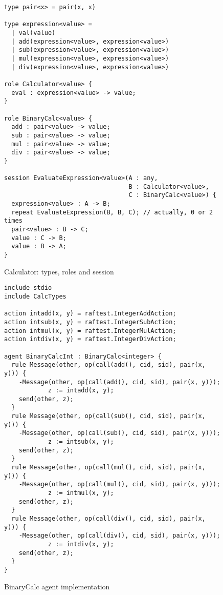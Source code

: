 \documentclass[a4paper,12pt,oneside,fleqn]{book} %
\begin{document}
\begin{figure}\footnotesize %
\begin{verbatim}
type pair<x> = pair(x, x)

type expression<value> =
  | val(value)
  | add(expression<value>, expression<value>)
  | sub(expression<value>, expression<value>)
  | mul(expression<value>, expression<value>)
  | div(expression<value>, expression<value>)

role Calculator<value> {
  eval : expression<value> -> value;
}

role BinaryCalc<value> {
  add : pair<value> -> value;
  sub : pair<value> -> value;
  mul : pair<value> -> value;
  div : pair<value> -> value;
}

session EvaluateExpression<value>(A : any,
                                  B : Calculator<value>,
                                  C : BinaryCalc<value>) {
  expression<value> : A -> B;
  repeat EvaluateExpression(B, B, C); // actually, 0 or 2 times
  pair<value> : B -> C;
  value : C -> B;
  value : B -> A;
}
\end{verbatim}
\caption{Calculator: types, roles and session}
\label{fig:calc-roles}
\end{figure} %

\begin{figure}\footnotesize %
\begin{verbatim}
include stdio
include CalcTypes

action intadd(x, y) = raftest.IntegerAddAction;
action intsub(x, y) = raftest.IntegerSubAction;
action intmul(x, y) = raftest.IntegerMulAction;
action intdiv(x, y) = raftest.IntegerDivAction;

agent BinaryCalcInt : BinaryCalc<integer> {
  rule Message(other, op(call(add(), cid, sid), pair(x, y))) {
    -Message(other, op(call(add(), cid, sid), pair(x, y)));
            z := intadd(x, y);
    send(other, z);
  }
  rule Message(other, op(call(sub(), cid, sid), pair(x, y))) {
    -Message(other, op(call(sub(), cid, sid), pair(x, y)));
            z := intsub(x, y);
    send(other, z);
  }
  rule Message(other, op(call(mul(), cid, sid), pair(x, y))) {
    -Message(other, op(call(mul(), cid, sid), pair(x, y)));
            z := intmul(x, y);
    send(other, z);
  }
  rule Message(other, op(call(div(), cid, sid), pair(x, y))) {
    -Message(other, op(call(div(), cid, sid), pair(x, y)));
            z := intdiv(x, y);
    send(other, z);
  }
}
\end{verbatim}
\caption{BinaryCalc agent implementation}
\label{fig:bcalc-rules}
\end{figure} %
\end{document}
